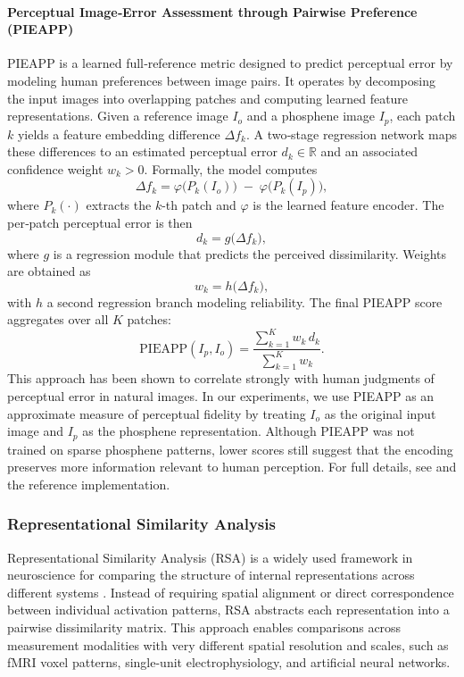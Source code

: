 \paragraph{Perceptual Image‐Error Assessment through Pairwise Preference (PIEAPP)}  
PIEAPP \cite{Prashnani2018} is a learned full‐reference metric designed to predict perceptual error by modeling human preferences between image pairs. It operates by decomposing the input images into overlapping patches and computing learned feature representations. Given a reference image \(I_o\) and a phosphene image \(I_p\), each patch \(k\) yields a feature embedding difference \(\Delta f_k\). A two‐stage regression network maps these differences to an estimated perceptual error \(d_k\in\mathbb{R}\) and an associated confidence weight \(w_k>0\). Formally, the model computes
\[
\Delta f_k = \varphi\bigl(P_k(I_o)\bigr)\;-\;\varphi\bigl(P_k(I_p)\bigr),
\]
where \(P_k(\cdot)\) extracts the \(k\)-th patch and \(\varphi\) is the learned feature encoder. The per‐patch perceptual error is then
\[
d_k = g\bigl(\Delta f_k\bigr),
\]
where \(g\) is a regression module that predicts the perceived dissimilarity. Weights are obtained as
\[
w_k = h\bigl(\Delta f_k\bigr),
\]
with \(h\) a second regression branch modeling reliability. The final PIEAPP score aggregates over all \(K\) patches:
\[
\mathrm{PIEAPP}(I_p, I_o)
= \frac{\sum_{k=1}^K w_k \, d_k}{\sum_{k=1}^K w_k}.
\]
This approach has been shown to correlate strongly with human judgments of perceptual error in natural images. In our experiments, we use PIEAPP as an approximate measure of perceptual fidelity by treating \(I_o\) as the original input image and \(I_p\) as the phosphene representation. Although PIEAPP was not trained on sparse phosphene patterns, lower scores still suggest that the encoding preserves more information relevant to human perception. For full details, see \cite{Prashnani2018} and the reference implementation.  


\subsubsection{Representational Similarity Analysis}
Representational Similarity Analysis (RSA) is a widely used framework in neuroscience for comparing the structure of internal representations across different systems \cite{Kriegeskorte2008}. Instead of requiring spatial alignment or direct correspondence between individual activation patterns, RSA abstracts each representation into a pairwise dissimilarity matrix. This approach enables comparisons across measurement modalities with very different spatial resolution and scales, such as fMRI voxel patterns, single-unit electrophysiology, and artificial neural networks.

